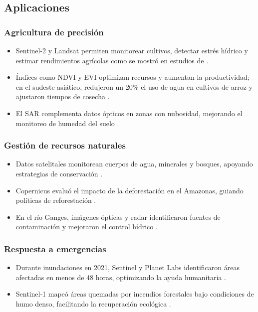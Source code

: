     \subsection{Aplicaciones}

        \subsubsection{Agricultura de precisión}
        
            \begin{itemize}[left=1.27cm]
                \item Sentinel-2 y Landsat permiten monitorear cultivos, detectar estrés hídrico y estimar rendimientos agrícolas como se mostró en estudios de \textcite{griffiths2019intra, ed2020recent}.
                \item Índices como NDVI y EVI optimizan recursos y aumentan la productividad; en el sudeste asiático, redujeron un 20\% el uso de agua en cultivos de arroz y ajustaron tiempos de cosecha \autocite{kaushik2021crop}.
                \item El SAR complementa datos ópticos en zonas con nubosidad, mejorando el monitoreo de humedad del suelo \autocite{kaushik2021crop}.
            \end{itemize}
        
        \subsubsection{Gestión de recursos naturales}
            \begin{itemize}[left=1.27cm]
                \item Datos satelitales monitorean cuerpos de agua, minerales y bosques, apoyando estrategias de conservación \autocite{rast2019copernicus}.
                \item Copernicus evaluó el impacto de la deforestación en el Amazonas, guiando políticas de reforestación \autocite{rast2019copernicus}.
                \item En el río Ganges, imágenes ópticas y radar identificaron fuentes de contaminación y mejoraron el control hídrico \autocite{caballero2019sentinel, lisboa2024earth}.
            \end{itemize}
            
        \subsubsection{Respuesta a emergencias}
            \begin{itemize}[left=1.27cm]
                \item Durante inundaciones en 2021, Sentinel y Planet Labs identificaron áreas afectadas en menos de 48 horas, optimizando la ayuda humanitaria \autocite{matgen2020feasibility}.
                \item Sentinel-1 mapeó áreas quemadas por incendios forestales bajo condiciones de humo denso, facilitando la recuperación ecológica \autocite{ajmar2017response}.
            \end{itemize}

